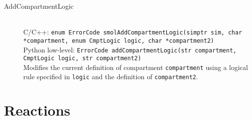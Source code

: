 \documentclass {book}
\newcommand {\ttt} {\texttt}
\begin{document}
\begin{description}
\item[AddCompartmentLogic]
\hfill \\
C/C++: \ttt{enum ErrorCode smolAddCompartmentLogic(simptr sim, char *compartment, enum CmptLogic logic, char *compartment2)}\\
Python low-level: \ttt{ErrorCode addCompartmentLogic(str compartment, CmptLogic logic, str compartment2)}\\
Modifies the current definition of compartment \ttt{compartment} using a logical rule specified in \ttt{logic} and the definition of \ttt{compartment2}.

\end{description}

\section{Reactions}
\end{document}
